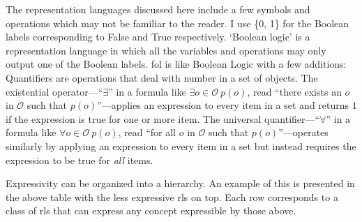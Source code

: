 \documentclass[doc,floatsintext]{apa6}
\begin{document}
The representation languages discussed here include a few symbols and operations which may not be familiar to the reader. I use \{0, 1\} for the Boolean labels corresponding to False and True respectively. `Boolean logic' is a representation language in which all the variables and operations may only output one of the Boolean labels. \Ac{fol} is like Boolean Logic with a few additions: Quantifiers are operations that deal with number in a set of objects. The existential operator---``$\exists$'' in a formula like $\exists o \in \mathcal{O} ~ p(o)$, read ``there exists an $o$ in $\mathcal{O}$ such that $p(o)$''---applies an expression to every item in a set and returns $1$ if the expression is true for one or more item. The universal quantifier---``$\forall$'' in a formula like $\forall o \in \mathcal{O} ~ p(o)$, read ``for all $o$ in $\mathcal{O}$ such that $p(o)$''---operates similarly by applying an expression to every item in a set but instead requires the expression to be true for \emph{all} items.

\begin{table}
\centering
{}
\caption{Levels of expression}
\begin{tablenotes}
{\small
Expressivity can be organized into a hierarchy. An example of this is presented in the above table with the less expressive \acp{rl} on top. Each row corresponds to a class of \acp{rl} that can express any concept expressible by those above.
}
\end{tablenotes} \label{tbl:levels}
\end{table}
\end{document}
